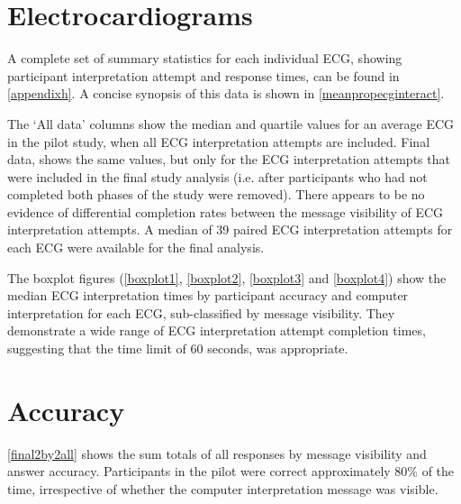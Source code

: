 \section{Electrocardiograms}
\label{electrocardiograms}

A complete set of summary statistics for each individual ECG, showing participant interpretation attempt and response times, can be found in \autoref{appendixh}. A concise synopsis of this data is shown in \autoref{meanpropecginteract}. 

  

The `All data' columns show the median and quartile values for an average ECG in the pilot study, when all ECG interpretation attempts are included. Final data, shows the same values, but only for the ECG interpretation attempts that were included in the final study analysis (i.e. after participants who had not completed both phases of the study were removed). There appears to be no evidence of differential completion rates between the message visibility of ECG interpretation attempts. A median of 39 paired ECG interpretation attempts for each ECG were available for the final analysis.

The boxplot figures (\autoref{boxplot1}, \autoref{boxplot2}, \autoref{boxplot3} and \autoref{boxplot4}) show the median ECG interpretation times by participant accuracy and computer interpretation for each ECG, sub-classified by message visibility. They demonstrate a wide range of ECG interpretation attempt completion times, suggesting that the time limit of 60 seconds, was appropriate.

  

 \newpage  

\section{Accuracy}
\label{accuracy}

\autoref{final2by2all} shows the sum totals of all responses by message visibility and answer accuracy. Participants in the pilot were correct approximately 80\% of the time, irrespective of whether the computer interpretation message was visible. 

